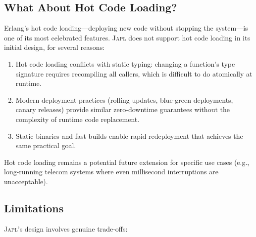 \documentclass[11pt,twocolumn]{article}
\newcommand{\japl}{\textsc{Japl}}
\begin{document}
\subsection{What About Hot Code Loading?}

Erlang's hot code loading---deploying new code without stopping the system---is one of its most celebrated features.
\japl{} does not support hot code loading in its initial design, for several reasons:

\begin{enumerate}[leftmargin=*]
\item Hot code loading conflicts with static typing: changing a function's type signature requires recompiling all callers, which is difficult to do atomically at runtime.
\item Modern deployment practices (rolling updates, blue-green deployments, canary releases) provide similar zero-downtime guarantees without the complexity of runtime code replacement.
\item Static binaries and fast builds enable rapid redeployment that achieves the same practical goal.
\end{enumerate}

Hot code loading remains a potential future extension for specific use cases (e.g., long-running telecom systems where even millisecond interruptions are unacceptable).

\subsection{Limitations}

\japl{}'s design involves genuine trade-offs:
\end{document}
